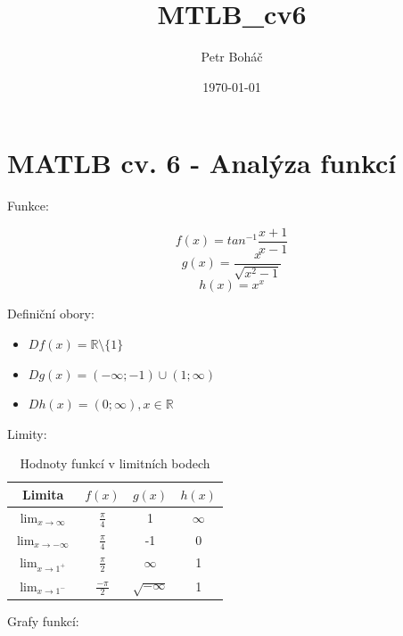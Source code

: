 \documentclass[a4paper,12pt]{article}
\title{MTLB_cv6}
\author{Petr Boháč}
\date{\today}
\begin{document}
\section*{MATLB cv. 6 - Analýza funkcí}

    
    Funkce:
    
    \begin{equation}
        f(x) = tan^{-1} \frac{x+1}{x-1}
    \end{equation}
    \begin{equation}
        g(x) = \frac{x}{\sqrt{x^2-1}}
    \end{equation}
    \begin{equation}
        h(x) = x^x
    \end{equation}


    Definiční obory:
    
    \begin{itemize}
        \item $D f(x) = \mathbb{R} \setminus{\{1\}} $
        \item $D g(x) = (-\infty; -1) \cup (1; \infty) $
        \item $D h(x) = (0; \infty), x \in \mathbb{R} $
    \end{itemize}
    
    Limity:
    
    \begin{table}[h]
        \centering
        \caption{Hodnoty funkcí v limitních bodech}
        \begin{tabular}{c|c|c|c}
           Limita & $f(x)$ & $g(x)$ & $h(x)$ \\
           \hline
           $\lim_{x\to\infty}$ & $\frac{\pi}{4}$ & 1 & $\infty$ \\
           $\lim_{x\to-\infty}$ & $\frac{\pi}{4}$ & -1 & 0 \\
           $\lim_{x\to1^{+}}$ & $\frac{\pi}{2}$ & $\infty$ & 1 \\
           $\lim_{x\to1^{-}}$ & $\frac{-\pi}{2}$ & $\sqrt{-\infty}$ & 1 
        \end{tabular}
        \label{tab:my_label}
    \end{table}
    
    
    Grafy funkcí:
    
\end{document}
